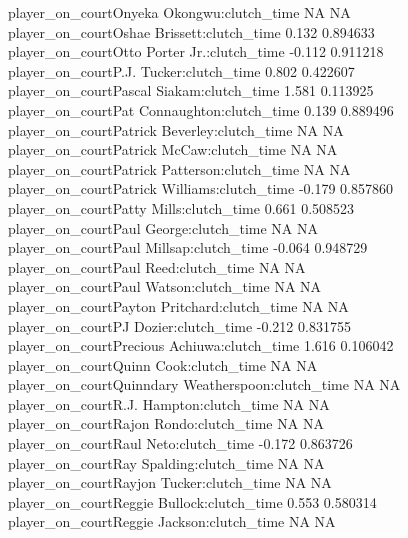 \documentclass[
  landscape]{article}
\begin{document}
player\_on\_courtOnyeka Okongwu:clutch\_time NA NA\\
player\_on\_courtOshae Brissett:clutch\_time 0.132 0.894633\\
player\_on\_courtOtto Porter Jr.:clutch\_time -0.112 0.911218\\
player\_on\_courtP.J. Tucker:clutch\_time 0.802 0.422607\\
player\_on\_courtPascal Siakam:clutch\_time 1.581 0.113925\\
player\_on\_courtPat Connaughton:clutch\_time 0.139 0.889496\\
player\_on\_courtPatrick Beverley:clutch\_time NA NA\\
player\_on\_courtPatrick McCaw:clutch\_time NA NA\\
player\_on\_courtPatrick Patterson:clutch\_time NA NA\\
player\_on\_courtPatrick Williams:clutch\_time -0.179 0.857860\\
player\_on\_courtPatty Mills:clutch\_time 0.661 0.508523\\
player\_on\_courtPaul George:clutch\_time NA NA\\
player\_on\_courtPaul Millsap:clutch\_time -0.064 0.948729\\
player\_on\_courtPaul Reed:clutch\_time NA NA\\
player\_on\_courtPaul Watson:clutch\_time NA NA\\
player\_on\_courtPayton Pritchard:clutch\_time NA NA\\
player\_on\_courtPJ Dozier:clutch\_time -0.212 0.831755\\
player\_on\_courtPrecious Achiuwa:clutch\_time 1.616 0.106042\\
player\_on\_courtQuinn Cook:clutch\_time NA NA\\
player\_on\_courtQuinndary Weatherspoon:clutch\_time NA NA\\
player\_on\_courtR.J. Hampton:clutch\_time NA NA\\
player\_on\_courtRajon Rondo:clutch\_time NA NA\\
player\_on\_courtRaul Neto:clutch\_time -0.172 0.863726\\
player\_on\_courtRay Spalding:clutch\_time NA NA\\
player\_on\_courtRayjon Tucker:clutch\_time NA NA\\
player\_on\_courtReggie Bullock:clutch\_time 0.553 0.580314\\
player\_on\_courtReggie Jackson:clutch\_time NA NA\\
\end{document}
